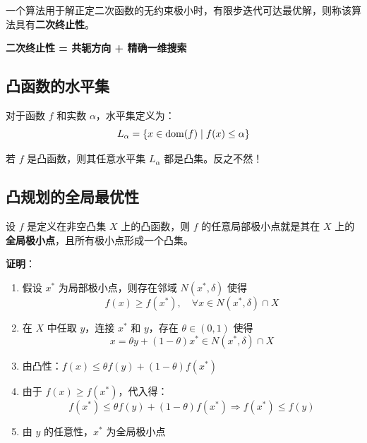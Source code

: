 \begin{definition}[二次终止性]
一个算法用于解正定二次函数的无约束极小时，有限步迭代可达最优解，则称该算法具有\textbf{二次终止性}。
\end{definition}

\textbf{二次终止性 = 共轭方向 + 精确一维搜索}

\subsection{凸函数的水平集}

\begin{definition}[水平集]
对于函数 $f$ 和实数 $\alpha$，水平集定义为：
\[
L_\alpha = \{x \in \operatorname{dom}(f) \mid f(x) \leq \alpha\}
\]
\end{definition}

\begin{property}[凸函数的水平集]
若 $f$ 是凸函数，则其任意水平集 $L_\alpha$ 都是凸集。反之不然！
\end{property}

\subsection{凸规划的全局最优性}

\begin{theorem}[凸规划的局部即全局]
设 $f$ 是定义在非空凸集 $X$ 上的凸函数，则 $f$ 的任意局部极小点就是其在 $X$ 上的\textbf{全局极小点}，且所有极小点形成一个凸集。
\end{theorem}

\textbf{证明}：
\begin{enumerate}[label=Step \arabic*:, leftmargin=2em]
    \item 假设 $x^*$ 为局部极小点，则存在邻域 $N(x^*, \delta)$ 使得
    \[f(x) \geq f(x^*),\quad \forall x \in N(x^*, \delta) \cap X\]
    \item 在 $X$ 中任取 $y$，连接 $x^*$ 和 $y$，存在 $\theta \in (0, 1)$ 使得
    \[x = \theta y + (1-\theta)x^* \in N(x^*, \delta) \cap X\]
    \item 由凸性：$f(x) \leq \theta f(y) + (1-\theta)f(x^*)$
    \item 由于 $f(x) \geq f(x^*)$，代入得：
    \[f(x^*) \leq \theta f(y) + (1-\theta)f(x^*) \Rightarrow f(x^*) \leq f(y)\]
    \item 由 $y$ 的任意性，$x^*$ 为全局极小点
\end{enumerate}

